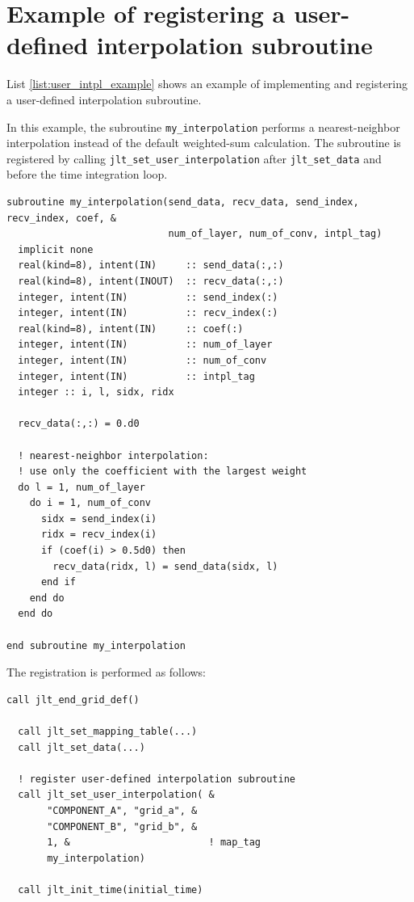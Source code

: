 \documentclass[11pt,a4paper]{report}
\newcommand{\lstref}[1]{List \ref{#1}}
\begin{document}
\section{Example of registering a user-defined interpolation subroutine}

\lstref{list:user_intpl_example} shows an example
of implementing and registering
a user-defined interpolation subroutine.

In this example, the subroutine \texttt{my\_interpolation}
performs a nearest-neighbor interpolation
instead of the default weighted-sum calculation.
The subroutine is registered
by calling \texttt{jlt\_set\_user\_interpolation}
after \texttt{jlt\_set\_data}
and before the time integration loop.

\begin{lstlisting}[caption=Example of user-defined interpolation registration,
                    label=list:user_intpl_example]
subroutine my_interpolation(send_data, recv_data, send_index, recv_index, coef, &
                            num_of_layer, num_of_conv, intpl_tag)
  implicit none
  real(kind=8), intent(IN)     :: send_data(:,:)
  real(kind=8), intent(INOUT)  :: recv_data(:,:)
  integer, intent(IN)          :: send_index(:)
  integer, intent(IN)          :: recv_index(:)
  real(kind=8), intent(IN)     :: coef(:)
  integer, intent(IN)          :: num_of_layer
  integer, intent(IN)          :: num_of_conv
  integer, intent(IN)          :: intpl_tag
  integer :: i, l, sidx, ridx

  recv_data(:,:) = 0.d0

  ! nearest-neighbor interpolation:
  ! use only the coefficient with the largest weight
  do l = 1, num_of_layer
    do i = 1, num_of_conv
      sidx = send_index(i)
      ridx = recv_index(i)
      if (coef(i) > 0.5d0) then
        recv_data(ridx, l) = send_data(sidx, l)
      end if
    end do
  end do

end subroutine my_interpolation
\end{lstlisting}

The registration is performed as follows:

\begin{lstlisting}[caption=Registering the user-defined subroutine,
                    label=list:user_intpl_register]
  call jlt_end_grid_def()

  call jlt_set_mapping_table(...)
  call jlt_set_data(...)

  ! register user-defined interpolation subroutine
  call jlt_set_user_interpolation( &
       "COMPONENT_A", "grid_a", &
       "COMPONENT_B", "grid_b", &
       1, &                        ! map_tag
       my_interpolation)

  call jlt_init_time(initial_time)
\end{lstlisting}
\end{document}
